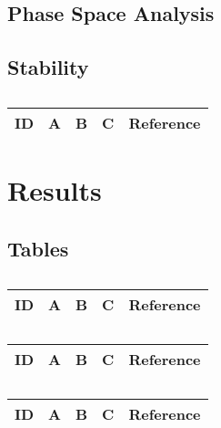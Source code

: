 \subsection{Phase Space Analysis}

\subsection{Stability}
\centering
\begin{table}[H]\footnotesize
	\caption{}
	\begin{tabular}{rp{1cm}p{2cm}p{3cm}p{1cm}}
		\hline
		ID & A & B & C & Reference \\
		\hline
		\hline
	\end{tabular}
\end{table}
\raggedright


\section{Results}


\subsection{Tables}

\centering
\begin{table}[H]\footnotesize
	\caption{}
	\begin{tabular}{rp{1cm}p{2cm}p{3cm}p{1cm}}
		\hline
		ID & A & B & C & Reference \\
		\hline
		\hline
	\end{tabular}
\end{table}
\raggedright

\centering
\begin{table}[H]\footnotesize
	\caption{}
	\begin{tabular}{rp{1cm}p{2cm}p{3cm}p{1cm}}
		\hline
		ID & A & B & C & Reference \\
		\hline
		\hline
	\end{tabular}
\end{table}
\raggedright

\centering
\begin{table}[H]\footnotesize
	\caption{}
	\begin{tabular}{rp{1cm}p{2cm}p{3cm}p{1cm}}
		\hline
		ID & A & B & C & Reference \\
		\hline
		\hline
	\end{tabular}
\end{table}
\raggedright


